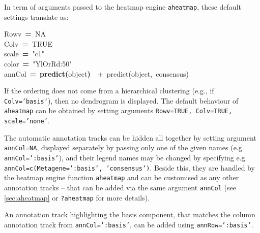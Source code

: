 \documentclass[a4paper]{article}\usepackage{graphicx, color}
\makeatletter
\newcommand{\hlnumber}[1]{\textcolor[rgb]{0,0,0}{#1}}%
\newcommand{\hlfunctioncall}[1]{\textcolor[rgb]{0.501960784313725,0,0.329411764705882}{\textbf{#1}}}%
\newcommand{\hlstring}[1]{\textcolor[rgb]{0.6,0.6,1}{#1}}%
\newcommand{\hlkeyword}[1]{\textcolor[rgb]{0,0,0}{\textbf{#1}}}%
\newcommand{\hlcomment}[1]{\textcolor[rgb]{0.180392156862745,0.6,0.341176470588235}{#1}}%
\newcommand{\hlassignement}[1]{\textcolor[rgb]{0,0,0}{\textbf{#1}}}%
\newcommand{\hlsymbol}[1]{\textcolor[rgb]{0,0,0}{#1}}%
\newcommand{\hlstd}[1]{\textcolor[rgb]{0,0,0}{#1}}%
\newenvironment{kframe}{%
 \def\FrameCommand##1{\hskip\@totalleftmargin \hskip-\fboxsep
 \colorbox{shadecolor}{##1}\hskip-\fboxsep
     \hskip-\linewidth \hskip-\@totalleftmargin \hskip\columnwidth}%
 \MakeFramed {\advance\hsize-\width
   \@totalleftmargin\z@ \linewidth\hsize
   \@setminipage}}%
 {\par\unskip\endMakeFramed}
\newenvironment{knitrout}{}{} %
\let\code=\texttt
\makeatother
\begin{document}
In term of arguments passed to the heatmap engine \code{aheatmap}, these default 
settings translate as:

\begin{knitrout}
\color{fgcolor}\begin{kframe}
\begin{flushleft}
\ttfamily\noindent
\hlsymbol{Rowv}{\ }\hlassignement{=}{\ }\hlnumber{NA}\hspace*{\fill}\\
\hlstd{}\hlsymbol{Colv}{\ }\hlassignement{=}{\ }\hlnumber{TRUE}\hspace*{\fill}\\
\hlstd{}\hlsymbol{scale}{\ }\hlassignement{=}{\ }\hlstring{"{}c1"{}}\hspace*{\fill}\\
\hlstd{}\hlsymbol{color}{\ }\hlassignement{=}{\ }\hlstring{"{}YlOrRd:50"{}}\hspace*{\fill}\\
\hlstd{}\hlsymbol{annCol}{\ }\hlassignement{=}{\ }\hlfunctioncall{predict}\hlkeyword{(}\hlsymbol{object}\hlkeyword{)}{\ }{\ }\hlcomment{\usebox{\hlnormalsizeboxhash}{\ }+{\ }predict(object,{\ }\usebox{\hlnormalsizeboxsinglequote}consensus\usebox{\hlnormalsizeboxsinglequote})}\mbox{}
\normalfont
\end{flushleft}
\end{kframe}
\end{knitrout}


If the ordering does not come from a hierarchical clustering (e.g., if
\code{Colv='basis'}), then no dendrogram is displayed.
The default behaviour of \code{aheatmap} can be obtained by setting arguments 
\code{Rowv=TRUE, Colv=TRUE, scale='none'}.

\medskip
The automatic annotation tracks can be hidden all together by setting argument 
\code{annCol=NA}, displayed separately by passing only one of the given names 
(e.g. \code{annCol=':basis'}), and their legend names may be changed by
specifying e.g.
\code{annCol=c(Metagene=':basis', 'consensus')}.
Beside this, they are handled by the heatmap engine function \code{aheatmap} 
and can be customised as any other annotation tracks -- that can be added via 
the same argument \code{annCol} (see \cref{sec:aheatmap} or \code{?aheatmap} for
more details).

An annotation track highlighting the basis component, that matches the column
annotation track from \code{annCol=':basis'}, can be added using
\code{annRow=':basis'}.
\end{document}
